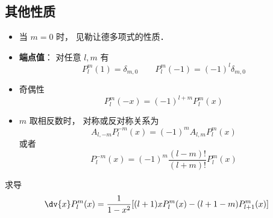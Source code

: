 \subsection{其他性质}
\begin{itemize}
\item 当 $m = 0$ 时， 见勒让德多项式的性质．

\item \textbf{端点值}： 对任意 $l, m$ 有
\begin{equation}\label{AsLgdr_eq2}
P_l^m(1) = \delta_{m, 0}
\qquad
P_l^m(-1) = (-1)^l \delta_{m, 0}
\end{equation}

\item 奇偶性
\begin{equation}
P_l^m(-x) = (-1)^{l+m}P_l^m(x)
\end{equation}

\item $m$ 取相反数时， 对称或反对称关系为
\begin{equation}
A_{l,-m} P_l^{-m}(x) = (-1)^m A_{l,m} P_l^m(x)
\end{equation}
或者
\begin{equation}
P_l^{-m}(x) = (-1)^m \frac{(l-m)!}{(l+m)!} P_l^m(x)
\end{equation}
\end{itemize}

求导
\begin{equation}
\dv{x} P_l^m(x) = \frac{1}{1-x^2} [(l+1)xP_l^m(x) - (l+1-m)P_{l+1}^m(x)]
\end{equation}

